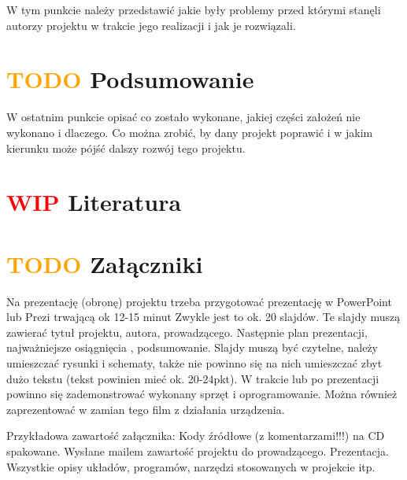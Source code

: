 \documentclass[11pt,titlepage,a4paper]{article}
\begin{document}
W tym punkcie należy przedstawić jakie były problemy przed którymi stanęli autorzy projektu w trakcie jego realizacji i jak je rozwiązali.

\newpage

\section{\textcolor{orange}{TODO} Podsumowanie}

W ostatnim punkcie opisać co zostało wykonane, jakiej części założeń nie wykonano i dlaczego. Co można zrobić, by dany projekt poprawić i w jakim kierunku może pójść dalszy rozwój tego projektu.

\newpage

\section{\textcolor{red}{WIP}  Literatura}

\printbibliography[heading=none]

\newpage

\section{\textcolor{orange}{TODO} Załączniki}

Na prezentację (obronę) projektu trzeba przygotować prezentację w PowerPoint lub Prezi trwającą ok 12-15 minut Zwykle jest to ok. 20 slajdów. Te slajdy muszą zawierać tytuł projektu, autora, prowadzącego. Następnie plan prezentacji, najważniejsze osiągnięcia , podsumowanie. Slajdy muszą być czytelne, należy umieszczać rysunki i schematy, także nie powinno się na nich umieszczać zbyt dużo tekstu (tekst powinien mieć ok. 20-24pkt). W trakcie lub po prezentacji powinno się zademonstrować wykonany sprzęt i oprogramowanie. Można również zaprezentować w zamian tego film z działania urządzenia.

Przykładowa zawartość załącznika:
Kody źródłowe (z komentarzami!!!) na CD spakowane.
Wysłane mailem zawartość projektu do prowadzącego.
Prezentacja.
Wszystkie opisy układów, programów, narzędzi stosowanych w projekcie itp.
\end{document}
